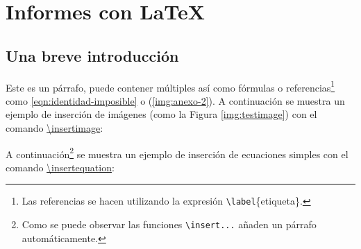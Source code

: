 \section{Informes con \LaTeX}

\subsection{Una breve introducción}
	
	Este es un párrafo, puede contener múltiples  así como fórmulas o referencias\footnote{Las referencias se hacen utilizando la expresión \texttt{\textbackslash label}\{etiqueta\}.} como \eqref{eqn:identidad-imposible} o (\ref{img:anexo-2}). A continuación se muestra un ejemplo de inserción de imágenes (como la Figura \ref{img:testimage}) con el comando \href{https://latex.ppizarror.com/informe.html#hlp-imagen}{\textbackslash insertimage}:



	A continuación\footnote{Como se puede observar las funciones \texttt{\textbackslash insert...} añaden un párrafo automáticamente.} se muestra un ejemplo de inserción de ecuaciones simples con el comando \href{https://latex.ppizarror.com/informe.html#hlp-formulae}{\textbackslash insertequation}:

